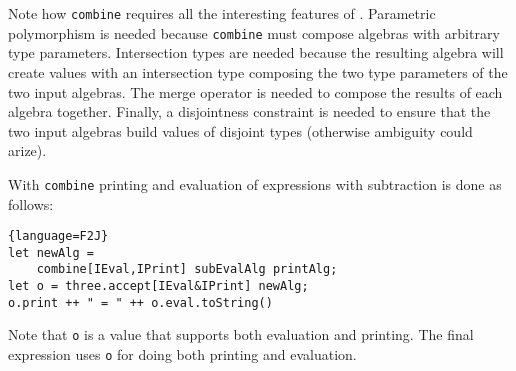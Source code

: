 Note how \lstinline{combine} requires all the interesting
features of \name. Parametric polymorphism is needed because
\lstinline{combine} must compose algebras with arbitrary type
parameters. Intersection types are needed because the resulting
algebra will create values with an intersection type composing
the two type parameters of the two input algebras. The merge operator 
is needed to compose the results of each algebra together. Finally, 
a disjointness constraint is needed to ensure that the two input
algebras build values of disjoint types (otherwise ambiguity could
arize).  

With \lstinline{combine} printing and evaluation of expressions with
subtraction is done as follows:

\begin{lstlisting}{language=F2J}
let newAlg =
    combine[IEval,IPrint] subEvalAlg printAlg;
let o = three.accept[IEval&IPrint] newAlg;
o.print ++ " = " ++ o.eval.toString()
\end{lstlisting}

Note that \lstinline$o$ is a value that supports both
evaluation and printing. The final expression uses \lstinline{o}
for doing both printing and evaluation.